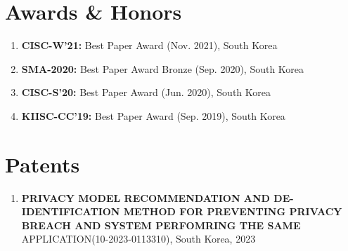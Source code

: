 \documentclass[letterpaper,11pt]{article}
\newcommand{\resumeItem}[1]{
  \item\small{
    {#1 \vspace{-2pt}}
  }
}
\newcommand{\paperListStart}{\begin{enumerate}}
\newcommand{\paperListEnd}{\end{enumerate}\vspace{-5pt}}
\begin{document}
\section{Awards \& Honors}
  \vspace{2pt}
  \paperListStart
   \resumeItem{\textbf{CISC-W'21:} Best Paper Award (Nov. 2021), South Korea}
   \resumeItem{\textbf{SMA-2020:} Best Paper Award \- Bronze (Sep. 2020), South Korea}
   \resumeItem{\textbf{CISC-S'20:} Best Paper Award (Jun. 2020), South Korea}
   \resumeItem{\textbf{KIISC-CC'19:} Best Paper Award (Sep. 2019), South Korea}
  \paperListEnd


\section{Patents}
  \vspace{3pt}
  \paperListStart
    \resumeItem
      {\textbf{PRIVACY MODEL RECOMMENDATION AND DE-IDENTIFICATION METHOD FOR PREVENTING PRIVACY BREACH AND SYSTEM PERFOMRING THE SAME}\\APPLICATION(10-2023-0113310), South Korea, 2023}
  \paperListEnd


\end{document}
